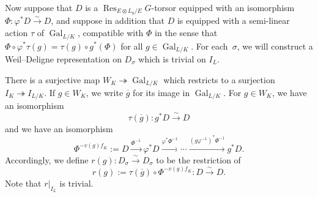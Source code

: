 \documentclass{amsart}
\theoremstyle{definition}
\theoremstyle{remark}
\newcommand{\mar}[1]{}
\newcommand{\mar}[1]{\marginpar{\raggedright\tiny squirrel #1}}
\DeclareMathOperator{\Gal}{Gal}
\newcommand{\Res}{\operatorname{Res}}
\begin{document}
Now suppose that $D$ is a $\Res_{E\otimes L_0/E}G$-torsor equipped
with an isomorphism $\Phi:\varphi^\ast D\xrightarrow{\sim}D$, and
suppose in addition that $D$ is equipped with a semi-linear action
$\tau$ of $\Gal_{L/K}$, compatible with $\Phi$ in the sense that
$\Phi\circ\varphi^\ast \tau(g)=\tau(g)\circ g^\ast(\Phi)$ for all
$g\in\Gal_{L/K}$. For each~$\sigma$, we will construct a Weil--Deligne representation on $D_\sigma$ which is trivial on $I_L$.  

There is a surjective map $W_K\twoheadrightarrow \Gal_{L/K}$ which restricts to a surjection $I_K\twoheadrightarrow I_{L/K}$.  If $g\in W_K$, we write $\overline{g}$ for its image in $\Gal_{L/K}$.
For $g\in W_K$, we have an isomorphism
\[	\tau(\overline{g}):g^\ast D\xrightarrow{\sim} D	\]
and we have an isomorphism
\[	\Phi^{-v(g)f_K}:=D\xrightarrow{\Phi^{-1}}\varphi^\ast D\xrightarrow{\varphi^\ast\Phi^{-1}}\cdots\xrightarrow{(g\varphi^{-1})^\ast\Phi^{-1}}g^\ast D.	\]
Accordingly, we define $r(g):D_\sigma\xrightarrow{\sim} D_\sigma$ to be the restriction of
\[
  r(g):=\tau(\overline{g})\circ\Phi^{-v(g)f_K}:D\xrightarrow{\sim} D.	\]%
Note that $r|_{I_L}$ is trivial.%
\end{document}
